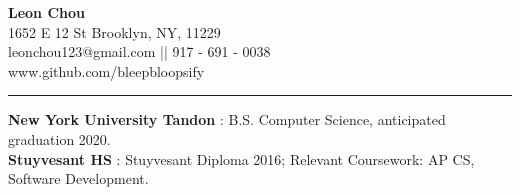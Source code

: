 \documentclass[14]{article}
\begin{document}
  \begin{center}
    \textbf{{\LARGE Leon Chou}}\\
    1652 E 12 St Brooklyn, NY, 11229 \\
    leonchou123@gmail.com || 917 - 691 - 0038\\ www.github.com/bleepbloopsify\\
  \end{center}
  \vspace{0.1cm} \hrule \vspace{0.2cm}
  \noindent\textbf{New York University Tandon} : B.S. Computer Science, anticipated graduation 2020.\\
  \textbf{Stuyvesant HS} : Stuyvesant Diploma 2016;
  Relevant Coursework: AP CS, Software Development.
\end{document}
